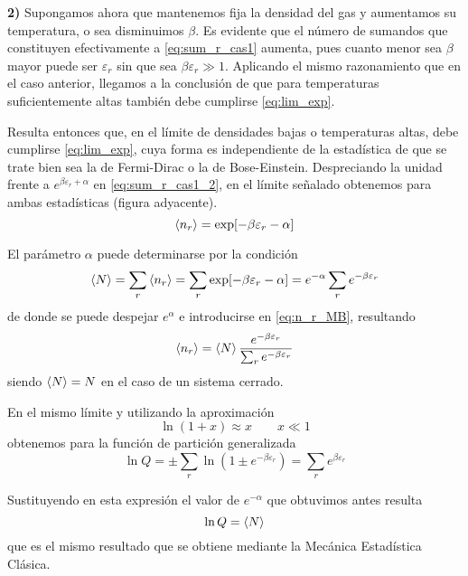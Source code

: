 \vspace{0.2cm}
\textbf{2)} Supongamos ahora que mantenemos fija la densidad del gas y aumentamos su temperatura, o sea disminuimos $\beta$.
Es evidente que el número de sumandos que constituyen efectivamente a \eqref{eq:sum_r_cas1} aumenta, pues cuanto menor sea $\beta$ mayor puede ser $\varepsilon_r$ sin que sea $\beta\varepsilon_r \gg 1$.
Aplicando el mismo razonamiento que en el caso anterior, llegamos a la conclusión de que para temperaturas suficientemente altas también debe cumplirse \eqref{eq:lim_exp}.

\begin{wrapfigure}{l}{0.35\textwidth}
	\centering
	\hspace{-1.8cm}
	
	\vspace{0.5cm}
\end{wrapfigure}
Resulta entonces que, en el límite de densidades bajas o temperaturas altas, debe cumplirse \eqref{eq:lim_exp}, cuya forma es independiente de la estadística de que se trate bien sea la de Fermi-Dirac o la de Bose-Einstein.
Despreciando la unidad frente a $e^{\beta\varepsilon_r + \alpha}$ en \eqref{eq:sum_r_cas1_2}, en el límite señalado obtenemos para ambas estadísticas (figura adyacente).
\begin{equation}\label{eq:n_r_MB}
	\expval{n_r} = \exp[-\beta\varepsilon_r - \alpha]
\end{equation}

El parámetro $\alpha$ puede determinarse por la condición
\begin{equation}
	\expval{N} = \sum_r \expval{n_r} = \sum_r \exp[-\beta\varepsilon_r - \alpha] = e^{-\alpha} \sum_r e^{-\beta\varepsilon_r}
\end{equation}
de donde se puede despejar $e^{\alpha}$ e introducirse en \eqref{eq:n_r_MB}, resultando
\begin{equation}
	\expval{n_r} = \expval{N} \frac{e^{-\beta\varepsilon_r}}{\sum_r e^{-\beta\varepsilon_r}}
\end{equation}
siendo $\expval{N} = N$ en el caso de un sistema cerrado.

En el mismo límite y utilizando la aproximación
$$\ln(1+x) \approx x \qquad x \ll 1$$
obtenemos para la función de partición generalizada
\begin{equation}
	\ln Q = \pm \sum_r \ln(1 \pm e^{-\beta\varepsilon_r}) = \sum_r e^{\beta\varepsilon_r}
\end{equation}

Sustituyendo en esta expresión el valor de $e^{-\alpha}$ que obtuvimos antes resulta
\begin{equation}
	\ln Q = \expval{N}
\end{equation}
que es el mismo resultado que se obtiene mediante la Mecánica Estadística Clásica.

